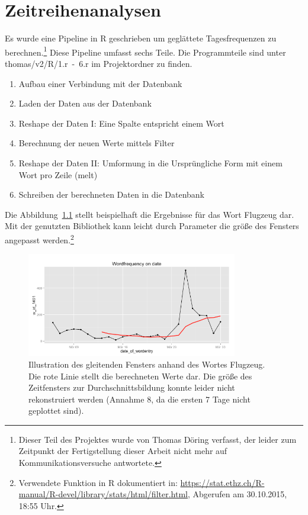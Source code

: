 \chapter{Zeitreihenanalysen}
Es wurde eine Pipeline in R geschrieben um geglättete Tagesfrequenzen zu berechnen.\footnote{Dieser Teil des Projektes wurde von Thomas Döring verfasst, der leider zum Zeitpunkt der Fertigstellung dieser Arbeit nicht mehr auf Kommunikationsversuche antwortete.} Diese Pipeline umfasst sechs Teile. Die Programmteile sind unter thomas/v2/R/1.r~-~6.r im Projektordner zu finden.
\begin{enumerate}
\item Aufbau einer Verbindung mit der Datenbank
\item Laden der Daten aus der Datenbank
\item Reshape der Daten I: Eine Spalte entspricht einem Wort
\item Berechnung der neuen Werte mittels Filter
\item Reshape der Daten II: Umformung in die Ursprüngliche Form mit einem Wort pro Zeile (melt)
\item Schreiben der berechneten Daten in die Datenbank 
\end{enumerate}
Die Abbildung~\ref{pic.time_airplane} stellt beispielhaft die Ergebnisse für das Wort Flugzeug dar. Mit der genutzten Bibliothek kann leicht durch Parameter die größe des Fensters angepasst werden.\footnote{Verwendete Funktion in R dokumentiert in: \url{https://stat.ethz.ch/R-manual/R-devel/library/stats/html/filter.html}, Abgerufen am 30.10.2015, 18:55 Uhr.}
\begin{figure}[h!]
    \centering
    \includegraphics[width=0.82\textwidth]{pictures/timeFlugzeug.png}
    \caption{Illustration des gleitenden Fensters anhand des Wortes Flugzeug. Die rote Linie stellt die berechneten Werte dar. Die größe des Zeitfensters zur Durchschnittsbildung konnte leider nicht rekonstruiert werden (Annahme 8, da die ersten 7 Tage nicht geplottet sind). }\label{pic.time_airplane}
\end{figure}

